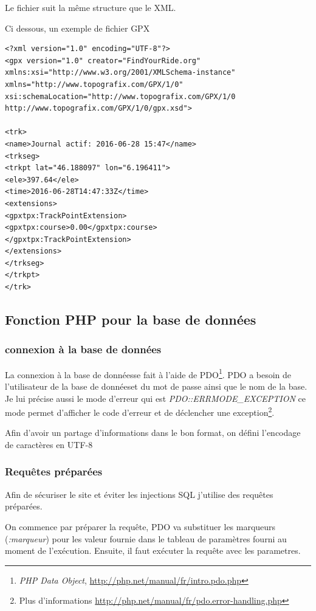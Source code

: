 \documentclass[a4paper]{article}
\newcommand{\bdd}{base de données}
\begin{document}
Le fichier suit la même structure que le XML.

Ci dessous, un exemple de fichier GPX

\begin{lstlisting}[frame=single] 
<?xml version="1.0" encoding="UTF-8"?>
<gpx version="1.0" creator="FindYourRide.org" xmlns:xsi="http://www.w3.org/2001/XMLSchema-instance" xmlns="http://www.topografix.com/GPX/1/0" xsi:schemaLocation="http://www.topografix.com/GPX/1/0 http://www.topografix.com/GPX/1/0/gpx.xsd">

<trk>
<name>Journal actif: 2016-06-28 15:47</name>
<trkseg>
<trkpt lat="46.188097" lon="6.196411">
<ele>397.64</ele>
<time>2016-06-28T14:47:33Z</time>
<extensions>
<gpxtpx:TrackPointExtension>
<gpxtpx:course>0.00</gpxtpx:course>
</gpxtpx:TrackPointExtension>
</extensions>
</trkseg>
</trkpt>
</trk>

\end{lstlisting}


\subsection{Fonction PHP pour la \bdd}
\subsubsection{connexion à la \bdd}
La connexion à la \bdd se fait à l'aide de PDO\footnote{\emph{PHP Data Object}, \url{http://php.net/manual/fr/intro.pdo.php}}. PDO a besoin de l'utilisateur de la \bdd et du mot de passe ainsi que le nom de la base.
Je lui précise aussi le mode d'erreur qui est \emph{PDO::ERRMODE\_EXCEPTION} ce mode permet d'afficher le code d'erreur et de déclencher une exception\footnote{Plus d'informations \url{http://php.net/manual/fr/pdo.error-handling.php}}.

Afin d'avoir un partage d'informations dans le bon format, on défini l'encodage de caractères en UTF-8

\subsubsection{Requêtes préparées}
Afin de sécuriser le site et éviter les injections SQL j'utilise des requêtes préparées.

On commence par préparer la requête, PDO va substituer les marqueurs (\emph{:marqueur}) pour les valeur fournie dans le tableau de paramètres fourni au moment de l'exécution. Ensuite, il faut exécuter la requête avec les parametres.
\end{document}
